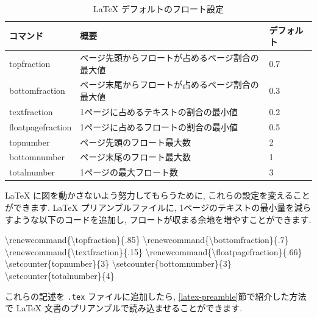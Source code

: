 \documentclass[
  11pt,
  lualatex,ja=standard,jafont=noto]{bxjsreport}
\newenvironment{Shaded}{\begin{snugshade}}{\end{snugshade}}
\newcommand{\ExtensionTok}[1]{#1}
\newcommand{\FunctionTok}[1]{\textcolor[rgb]{0.00,0.00,0.00}{#1}}
\newcommand{\NormalTok}[1]{#1}
\begin{document}
\begin{table}

\caption{\label{tab:float-default}LaTeX デフォルトのフロート設定}
\centering
\begin{tabular}[t]{l|l|l}
\hline
コマンド & 概要 & デフォルト\\
\hline
topfraction & ページ先頭からフロートが占めるページ割合の最大値 & 0.7\\
\hline
bottomfraction & ページ末尾からフロートが占めるページ割合の最大値 & 0.3\\
\hline
textfraction & 1ページに占めるテキストの割合の最小値 & 0.2\\
\hline
floatpagefraction & 1ページに占めるフロートの割合の最小値 & 0.5\\
\hline
topnumber & ページ先頭のフロート最大数 & 2\\
\hline
bottomnumber & ページ末尾のフロート最大数 & 1\\
\hline
totalnumber & 1ページの最大フロート数 & 3\\
\hline
\end{tabular}
\end{table}

LaTeX に図を動かさないよう努力してもらうために, これらの設定を変えることができます. LaTeX プリアンブルファイルに, 1ページのテキストの最小量を減らすような以下のコードを追加し, フロートが収まる余地を増やすことができます.

\begin{Shaded}
\begin{Highlighting}[]
\FunctionTok{\textbackslash{}renewcommand}\NormalTok{\{}\ExtensionTok{\textbackslash{}topfraction}\NormalTok{\}\{.85\}}
\FunctionTok{\textbackslash{}renewcommand}\NormalTok{\{}\ExtensionTok{\textbackslash{}bottomfraction}\NormalTok{\}\{.7\}}
\FunctionTok{\textbackslash{}renewcommand}\NormalTok{\{}\ExtensionTok{\textbackslash{}textfraction}\NormalTok{\}\{.15\}}
\FunctionTok{\textbackslash{}renewcommand}\NormalTok{\{}\ExtensionTok{\textbackslash{}floatpagefraction}\NormalTok{\}\{.66\}}
\FunctionTok{\textbackslash{}setcounter}\NormalTok{\{topnumber\}\{3\}}
\FunctionTok{\textbackslash{}setcounter}\NormalTok{\{bottomnumber\}\{3\}}
\FunctionTok{\textbackslash{}setcounter}\NormalTok{\{totalnumber\}\{4\}}
\end{Highlighting}
\end{Shaded}

これらの記述を \texttt{.tex} ファイルに追加したら, \ref{latex-preamble}節で紹介した方法で LaTeX 文書のプリアンブルで読み込ませることができます.
\end{document}
